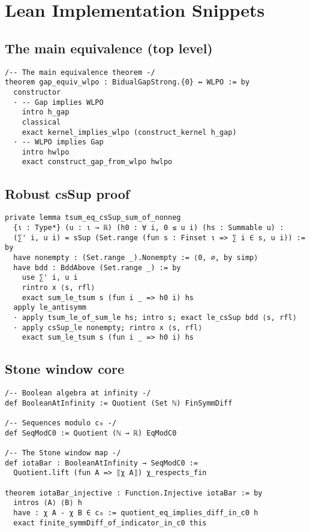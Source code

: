\documentclass{lmcs}
\begin{document}

\appendix

\section{Lean Implementation Snippets}

\subsection{The main equivalence (top level)}

\begin{lstlisting}[caption={Complete bidirectional proof (top level)}]
/-- The main equivalence theorem -/
theorem gap_equiv_wlpo : BidualGapStrong.{0} ↔ WLPO := by
  constructor
  · -- Gap implies WLPO
    intro h_gap
    classical
    exact kernel_implies_wlpo (construct_kernel h_gap)
  · -- WLPO implies Gap
    intro hwlpo
    exact construct_gap_from_wlpo hwlpo
\end{lstlisting}

\subsection{Robust csSup proof}\label{app:csSup-proof}

\begin{lstlisting}[caption={csSup of partial sums equals the tsum (nonnegative case)}]
private lemma tsum_eq_csSup_sum_of_nonneg
  {ι : Type*} (u : ι → ℝ) (h0 : ∀ i, 0 ≤ u i) (hs : Summable u) :
  (∑' i, u i) = sSup (Set.range (fun s : Finset ι => ∑ i ∈ s, u i)) := by
  have nonempty : (Set.range _).Nonempty := ⟨0, ∅, by simp⟩
  have bdd : BddAbove (Set.range _) := by
    use ∑' i, u i
    rintro x ⟨s, rfl⟩
    exact sum_le_tsum s (fun i _ => h0 i) hs
  apply le_antisymm
  · apply tsum_le_of_sum_le hs; intro s; exact le_csSup bdd ⟨s, rfl⟩
  · apply csSup_le nonempty; rintro x ⟨s, rfl⟩
    exact sum_le_tsum s (fun i _ => h0 i) hs
\end{lstlisting}

\subsection{Stone window core}\label{app:stone-window}

\begin{lstlisting}[caption={Core sketches for Stone window}]
/-- Boolean algebra at infinity -/
def BooleanAtInfinity := Quotient (Set ℕ) FinSymmDiff

/-- Sequences modulo c₀ -/
def SeqModC0 := Quotient (ℕ → ℝ) EqModC0

/-- The Stone window map -/
def iotaBar : BooleanAtInfinity → SeqModC0 :=
  Quotient.lift (fun A => ⟦χ A⟧) χ_respects_fin

theorem iotaBar_injective : Function.Injective iotaBar := by
  intros ⟨A⟩ ⟨B⟩ h
  have : χ A - χ B ∈ c₀ := quotient_eq_implies_diff_in_c0 h
  exact finite_symmDiff_of_indicator_in_c0 this
\end{lstlisting}
\end{document}
